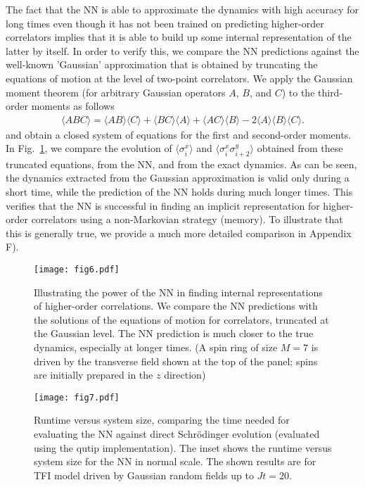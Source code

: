 \documentclass[a4paper,aps,amsmath,amssymb,twocolumn,longbibliography,,accepted=2022-05-17]{quantumarticle}
\begin{document}
The fact that the NN is able to approximate the dynamics with high accuracy for long times even though it has not been trained on predicting higher-order correlators implies that it is able to build up some internal representation of the latter by itself. In order to verify this, we compare the NN predictions against the well-known 'Gaussian' approximation that is obtained by truncating the equations of motion at the level of two-point correlators. We apply the Gaussian moment theorem \cite{mandel1995optical} (for arbitrary Gaussian operators $A$, $B$, and $C$) to the third-order moments as follows
\begin{align}
	\langle ABC \rangle=\langle AB \rangle \langle C \rangle+ \langle BC \rangle \langle A \rangle+ \langle AC \rangle \langle B \rangle- 2 \langle A \rangle \langle B \rangle \langle C \rangle.
\end{align}
 and obtain a closed system of equations for the first and second-order moments.  In Fig.~\ref{fig6}, we compare the evolution of $ \langle \sigma_{i}^{x} \rangle$ and $ \langle \sigma_{i}^{x} \sigma_{i+2}^{y}\rangle$ obtained from these truncated equations, from the NN, and from the exact dynamics. As can be seen, the dynamics extracted from the Gaussian approximation is valid only during a short time, while the prediction of the NN holds during much longer times. This verifies that the NN is successful in finding an implicit representation for higher-order correlators using a non-Markovian strategy (memory). To illustrate that this is generally true, we provide a much more detailed comparison in  Appendix F).

\begin{figure}[t]
	\centering
	\texttt{[image: fig6.pdf]}
	\caption{
		Illustrating the power of the NN in finding internal representations of higher-order correlations. We compare the NN predictions with the solutions of the equations of motion for correlators, truncated at the Gaussian level. The NN prediction is much closer to the true dynamics, especially at longer times. (A spin ring of size $M=7$ is driven by the transverse field shown at the top of the panel; spins are initially prepared in the $z$ direction)
	}
	\label{fig6}
\end{figure}

\begin{figure}[t]
	\centering
	\texttt{[image: fig7.pdf]}
	\caption{
		Runtime versus system size, comparing the time needed for evaluating the NN against direct Schr\"odinger evolution (evaluated using the qutip implementation). The inset shows the runtime  versus system size for the NN in normal scale. The shown results are for TFI model driven by  Gaussian random fields up to $Jt=20$.
	}
	\label{fig7}
\end{figure}
\end{document}
